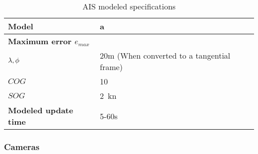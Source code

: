 \begin{table}[H]
	\centering
	\caption{AIS modeled specifications}
	\label{tab:AIS_specs}
	\begin{tabular}{ll}
		\hline
		\textbf{Model} & a \\ \hline
		\textbf{Maximum error $e_{max}$} &  \\
		${{\lambda} ,{\phi}}$ & 20m (When converted to a tangential frame) \\
		${COG}$ & \SI{10}{\deg} \\
		${SOG}$ & \SI{2}{\knot} \\ \hline
		\textbf{Modeled update time} & 5-60s \\ \hline
	\end{tabular}
\end{table}

\subsubsection{Cameras}

